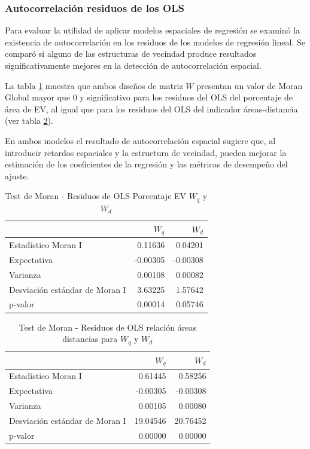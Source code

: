 \documentclass[12pt,a4paper,openany]{book}
\theoremstyle{definition}
\theoremstyle{definition}
\theoremstyle{definition}
\theoremstyle{remark}
\begin{document}
\subsubsection{Autocorrelación residuos de los
OLS}\label{autocorrelaciuxf3n-residuos-de-los-ols-1}

Para evaluar la utilidad de aplicar modelos espaciales de regresión se
examinó la existencia de autocorrelación en los residuos de los modelos
de regresión lineal. Se comparó si alguno de las estructuras de vecindad
produce resultados significativamente mejores en la detección de
autocorrelación espacial.

La tabla \ref{tab:moran-resareaep-w} muestra que ambos diseños de matriz
\(W\) presentan un valor de Moran Global mayor que 0 y significativo
para los residuos del OLS del porcentaje de área de EV, al igual que
para los residuos del OLS del indicador áreas-distancia (ver tabla
\ref{tab:moran-resareadist-w}).

En ambos modelos el resultado de autocorrelación espacial sugiere que,
al introducir retardos espaciales y la estructura de vecindad, pueden
mejorar la estimación de los coeficientes de la regresión y las métricas
de desempeño del ajuste.

\begin{table}[H]

\caption{\label{tab:moran-resareaep-w}Test de Moran - Residuos de OLS Porcentaje EV $W_q$ y $W_d$}
\centering
\begin{tabular}{lrr}
\toprule
  & $W_q$ & $W_d$\\
\midrule
Estadístico Moran I & 0.11636 & 0.04201\\
Expectativa & -0.00305 & -0.00308\\
Varianza & 0.00108 & 0.00082\\
Desviación estándar de Moran I & 3.63225 & 1.57642\\
p-valor & 0.00014 & 0.05746\\
\bottomrule
\end{tabular}
\end{table}

\begin{table}[H]

\caption{\label{tab:moran-resareadist-w}Test de Moran - Residuos de OLS relación áreas distancias para $W_q$ y $W_d$}
\centering
\begin{tabular}{lrr}
\toprule
  & $W_q$ & $W_d$\\
\midrule
Estadístico Moran I & 0.61445 & 0.58256\\
Expectativa & -0.00305 & -0.00308\\
Varianza & 0.00105 & 0.00080\\
Desviación estándar de Moran I & 19.04546 & 20.76452\\
p-valor & 0.00000 & 0.00000\\
\bottomrule
\end{tabular}
\end{table}
\end{document}
